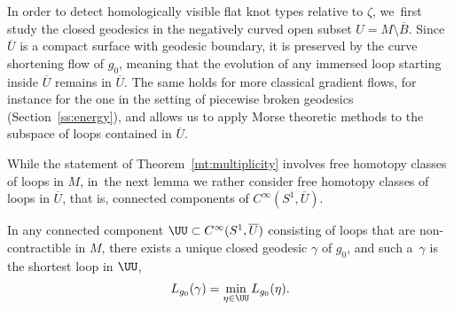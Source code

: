 In order to detect homologically visible flat knot types relative to $\zeta$, we~first study the closed geodesics in the negatively curved open subset $U=M\setminus\overline B$. Since $\overline U$ is a compact surface with geodesic boundary, it is preserved by the curve shortening flow of $g_0$, meaning that the evolution of any immersed loop starting inside $\overline U$ remains in $\overline U$. The same holds for more classical gradient flows, for instance for the one in the setting of piecewise broken geodesics (Section~\ref{ss:energy}), and allows us to apply Morse theoretic methods to the subspace of loops contained in $\overline U$.

While the statement of Theorem~\ref{mt:multiplicity} involves free homotopy classes of loops in $M$, in~the next lemma we rather consider free homotopy classes of loops in $\overline U$, that is, connected components of $C^\infty(S^1,\overline U)$.

\begin{Lemma}\label{l:unique_minimizer}
In any connected component $\UU\subset C^\infty(S^1,\overline U)$ consisting of loops that are non-contractible in $M$, there exists a unique closed geodesic $\gamma$ of $g_0$, and such a~$\gamma$ is the shortest loop in $\UU$, \ie
\begin{align*}
L_{g_0}(\gamma) = \min_{\eta\in\UU} L_{g_0}(\eta).
\end{align*}
\end{Lemma}

